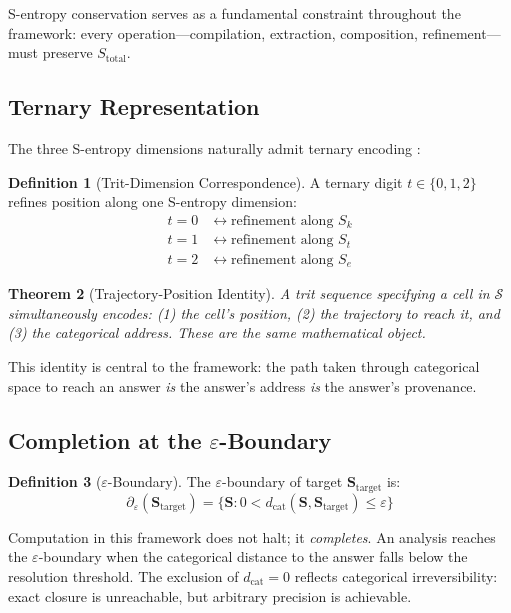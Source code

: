 \documentclass[10pt,twocolumn]{article}
\newtheorem{theorem}{Theorem}[section]
\theoremstyle{definition}
\newtheorem{definition}[theorem]{Definition}
\theoremstyle{remark}
\newcommand{\Sk}{S_k}
\newcommand{\St}{S_t}
\newcommand{\Se}{S_e}
\newcommand{\Scoord}{\mathbf{S}}
\newcommand{\Sspace}{\mathcal{S}}
\newcommand{\dcat}{d_{\mathrm{cat}}}
\newcommand{\Sk}{\mathscr{S}_k}
\newcommand{\Se}{\mathscr{S}_e}
\begin{document}
S-entropy conservation serves as a fundamental constraint throughout the framework: every operation---compilation, extraction, composition, refinement---must preserve $S_{\text{total}}$.

\subsection{Ternary Representation}

The three S-entropy dimensions naturally admit ternary encoding \cite{brusentsov1962,hayes2001}:

\begin{definition}[Trit-Dimension Correspondence]
A ternary digit $t \in \{0, 1, 2\}$ refines position along one S-entropy dimension:
\begin{align}
t = 0 &\leftrightarrow \text{refinement along } \Sk \\
t = 1 &\leftrightarrow \text{refinement along } \St \\
t = 2 &\leftrightarrow \text{refinement along } \Se
\end{align}
\end{definition}

\begin{theorem}[Trajectory-Position Identity]
\label{thm:trajectory_position}
A trit sequence specifying a cell in $\Sspace$ simultaneously encodes: (1) the cell's position, (2) the trajectory to reach it, and (3) the categorical address. These are the same mathematical object.
\end{theorem}

This identity is central to the framework: the path taken through categorical space to reach an answer \emph{is} the answer's address \emph{is} the answer's provenance.

\subsection{Completion at the $\varepsilon$-Boundary}

\begin{definition}[$\varepsilon$-Boundary]
The $\varepsilon$-boundary of target $\Scoord_{\text{target}}$ is:
\begin{equation}
\partial_\varepsilon(\Scoord_{\text{target}}) = \{\Scoord : 0 < \dcat(\Scoord, \Scoord_{\text{target}}) \leq \varepsilon\}
\end{equation}
\end{definition}

Computation in this framework does not halt; it \emph{completes}. An analysis reaches the $\varepsilon$-boundary when the categorical distance to the answer falls below the resolution threshold. The exclusion of $\dcat = 0$ reflects categorical irreversibility: exact closure is unreachable, but arbitrary precision is achievable.
\end{document}
